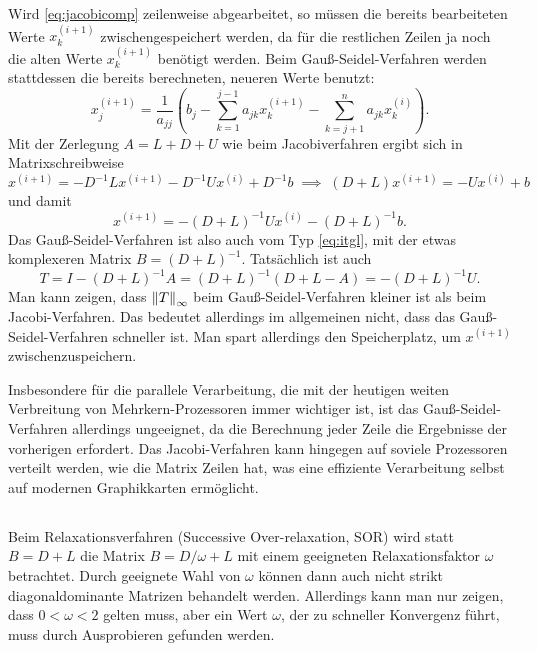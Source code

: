 Wird \eqref{eq:jacobicomp} zeilenweise abgearbeitet, so müssen die
bereits bearbeiteten Werte $x_k^{(i+1)}$ zwischengespeichert werden,
da für die restlichen Zeilen ja noch die alten Werte $x_k^{(i+1)}$
benötigt werden. Beim Gauß-Seidel-Verfahren werden stattdessen die
bereits berechneten, neueren Werte benutzt:
\begin{equation}
  x_j^{(i+1)} = \frac{1}{a_{jj}}\left(b_j -
    \sum_{k=1}^{j-1} a_{jk}x_k^{(i+1)} - \sum_{k=j+1}^n a_{jk}x_k^{(i)}\right).
\end{equation}
Mit der Zerlegung $A=L + D + U$ wie
beim Jacobiverfahren ergibt sich in Matrixschreibweise
\begin{equation}
  x^{(i+1)} = -D^{-1}L x^{(i+1)} - D^{-1} U x^{(i)} + D^{-1}b
  \;\implies\;
  (D + L)x^{(i+1)} = - U x^{(i)} + b
\end{equation}
und damit
\begin{equation}
  x^{(i+1)} = -(D+L)^{-1} U x^{(i)} - (D+L)^{-1}b.
\end{equation}
Das Gauß-Seidel-Verfahren ist also auch vom Typ \eqref{eq:itgl}, mit
der etwas komplexeren Matrix $B= (D+L)^{-1}$. Tatsächlich ist auch
\begin{equation}
  T = I - (D + L)^{-1} A = (D + L)^{-1}(D + L - A) = -(D+L)^{-1} U.
\end{equation}
Man kann zeigen, dass $\left\lVert{T}\right\rVert_\infty$ beim Gauß-Seidel-Verfahren
kleiner ist als beim Jacobi-Verfahren. Das bedeutet allerdings im
allgemeinen nicht, dass das Gauß-Seidel-Verfahren schneller ist. Man
spart allerdings den Speicherplatz, um $x^{(i+1)}$
zwischenzuspeichern.

Insbesondere für die parallele Verarbeitung, die mit der heutigen
weiten Verbreitung von Mehrkern-Prozessoren immer wichtiger ist, ist
das Gauß-Seidel-Verfahren allerdings ungeeignet, da die Berechnung
jeder Zeile die Ergebnisse der vorherigen erfordert. Das
Jacobi-Verfahren kann hingegen auf soviele Prozessoren verteilt
werden, wie die Matrix Zeilen hat, was eine effiziente Verarbeitung
selbst auf modernen Graphikkarten ermöglicht. 

\subsection{}

Beim Relaxationsverfahren (Successive Over-relaxation, SOR) wird statt
$B = D + L$ die Matrix $B = D/\omega + L$ mit einem geeigneten
Relaxationsfaktor $\omega$ betrachtet. Durch geeignete Wahl von
$\omega$ können dann auch nicht strikt diagonaldominante Matrizen
behandelt werden. Allerdings kann man nur zeigen, dass $0<\omega< 2$
gelten muss, aber ein Wert $\omega$, der zu schneller Konvergenz
führt, muss durch Ausprobieren gefunden werden.


